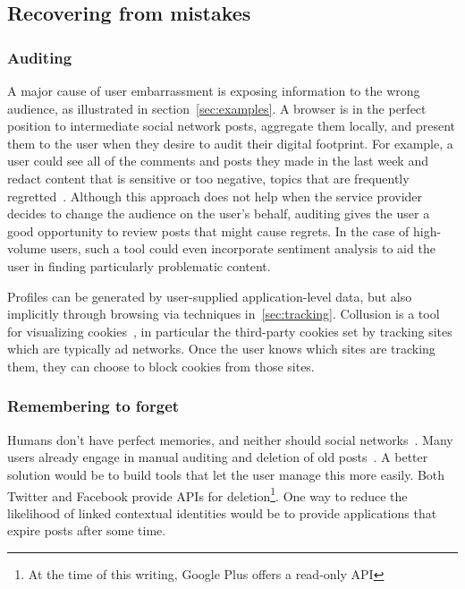 \documentclass{llncs}
\begin{document}
\begin{comment}
TODO: Discuss how private browsing mode maps to R, T, P?

At home use case:
R is household
T is porn?
P is null

Searching use case:
R is Google
T is search
P is null

GoogleShring use case
R is Google and the GoogleSharing proxy
T is search or browsing (analytics) (can't use any services that require logon)
P is random
\end{comment}

\subsection{Recovering from mistakes}
\subsubsection{Auditing}
A major cause of user embarrassment is exposing information to the wrong
audience, as illustrated in section~\ref{sec:examples}. A browser is in the
perfect position to intermediate social network posts, aggregate them locally,
and present them to the user when they desire to audit their digital footprint.
For example, a user could see all of the comments and posts they made in the
last week and redact content that is sensitive or too negative, topics that are
frequently regretted~\cite{wang}. Although this approach does not help when the
service provider decides to change the audience on the user's behalf, auditing
gives the user a good opportunity to review posts that might cause
regrets. In the case of high-volume users, such a tool could even incorporate
sentiment analysis to aid the user in finding particularly problematic content.

Profiles can be generated by user-supplied application-level data, but also
implicitly through browsing via techniques in~\ref{sec:tracking}. Collusion is a
tool for visualizing cookies~\cite{collusion}, in particular the third-party
cookies set by tracking sites which are typically ad networks.  Once the user
knows which sites are tracking them, they can choose to block cookies from
those sites.

\subsubsection{Remembering to forget}
Humans don't have perfect memories, and neither should social
networks~\cite{delete}. Many users already engage in manual auditing and
deletion of old posts~\cite{fbtips2}. A better solution would be to build tools
that let the user manage this more easily. Both Twitter and Facebook provide
APIs for deletion\footnote{At the time of this writing, Google Plus offers a
read-only API}. One way to reduce the likelihood of linked contextual
identities would be to provide applications that expire posts after some time.
\end{document}
